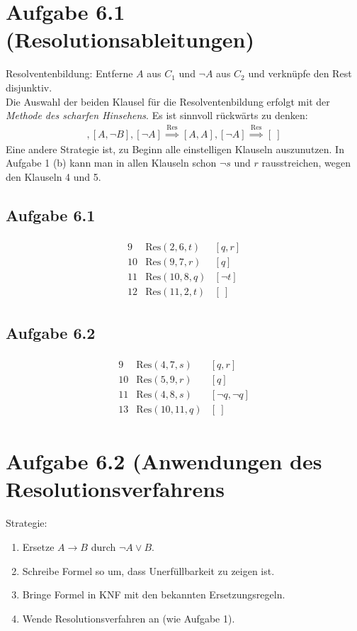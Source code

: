 \documentclass[12pt,a4paper]{article}
\author{Willi Sontopski}
\newcommand{\Res}{\text{Res}}
\newcommand{\Reso}{\stackrel{\Res}{\implies}}
\begin{document}

\section*{Aufgabe 6.1 (Resolutionsableitungen)}
Resolventenbildung: Entferne $A$ aus $C_1$ und $\neg A$ aus $C_2$ und verknüpfe den Rest disjunktiv.\\
Die Auswahl der beiden Klausel für die Resolventenbildung erfolgt mit der \textit{Methode des scharfen Hinsehens}. Es ist sinnvoll rückwärts zu denken:
\begin{align*}
[A,B],[A,\neg B],[\neg A]\Reso[A,A],[\neg A]\Reso[~]
\end{align*}
Eine andere Strategie ist, zu Beginn alle einstelligen Klauseln auszunutzen. In Aufgabe 1 (b) kann man in allen Klauseln schon $\neg s$ und $r$ rausstreichen, wegen den Klauseln 4 und 5.

\subsection*{Aufgabe 6.1}
\begin{align*}
\begin{array}{rll}
9 & \Res(2,6,t) & [q,r]\\
10 & \Res(9, 7,r) & [q]\\
11 & \Res(10,8,q) & [\neg t]\\
12 & \Res(11,2, t) & [~]
\end{array}
\end{align*}

\subsection*{Aufgabe 6.2}
\begin{align*}
\begin{array}{rll}
9 & \Res(4,7,s) & [q,r]\\
10 & \Res(5,9,r) & [q]\\
11 & \Res(4,8,s) & [\neg q,\neg q]\\
13 & \Res(10,11,q) & [~]
\end{array}
\end{align*}

\section*{Aufgabe 6.2 (Anwendungen des Resolutionsverfahrens}
Strategie:
\begin{enumerate}
\item Ersetze $A\to B$ durch $\neg A\vee B$.
\item Schreibe Formel so um, dass Unerfüllbarkeit zu zeigen ist.
\item Bringe Formel in KNF mit den bekannten Ersetzungsregeln.
\item Wende Resolutionsverfahren an (wie Aufgabe 1).
\end{enumerate}
\end{document}
